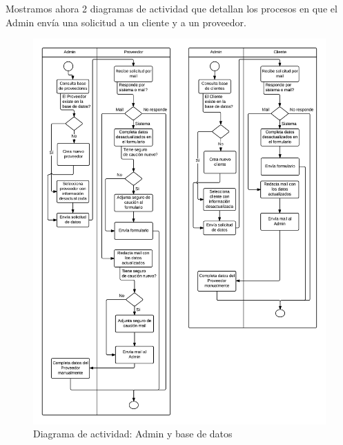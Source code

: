 Mostramos ahora 2 diagramas de actividad que detallan los procesos en que 
el Admin envía una solicitud a un cliente y a un proveedor. 

\begin{figure}[H]
\centering
\includegraphics[width=0.8\linewidth]{diag/nuevos/da-admin.png}
\caption{Diagrama de actividad: Admin y base de datos}
\label{da-admin}
\end{figure}
